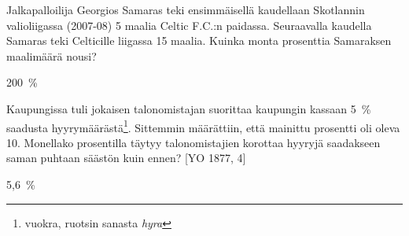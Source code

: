 \begin{tehtava}
Jalkapalloilija Georgios Samaras teki ensimmäisellä kaudellaan Skotlannin valioliigassa (2007-08) 5 maalia Celtic F.C.:n paidassa. Seuraavalla kaudella Samaras teki Celticille liigassa 15 maalia. Kuinka monta prosenttia Samaraksen maalimäärä nousi?
    \begin{vastaus}
200~\%
    \end{vastaus}
\end{tehtava}

\begin{tehtava}
 Kaupungissa tuli jokaisen talonomistajan suorittaa kaupungin kassaan 5~\% saadusta hyyrymäärästä\footnote{vuokra, ruotsin sanasta \emph{hyra}}. Sittemmin määrättiin, että mainittu prosentti oli oleva 10. Monellako prosentilla täytyy talonomistajien korottaa hyyryjä saadakseen saman puhtaan säästön kuin ennen? [YO 1877, 4]
    \begin{vastaus}
5,6~\%
    \end{vastaus}
\end{tehtava}
